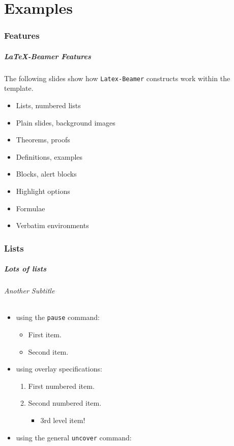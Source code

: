 \part{Examples}
\makepart
\section{Features}
\begin{frame}
        \frametitle{\LaTeX{}-Beamer Features}
        The following slides show how {\tt Latex-Beamer} constructs work within the
        template.
        \begin{itemize}
      \item Lists, numbered lists
      \item Plain slides, background images
      \item Theorems, proofs
      \item Definitions, examples
      \item Blocks, alert blocks
      \item Highlight options
      \item Formulae
      \item Verbatim environments
    \end{itemize}
\end{frame}

\section{Lists}
\begin{frame}
        \frametitle{Lots of lists}
        \framesubtitle{Another Subtitle}
        \begin{itemize}
          \item using the \texttt{pause} command:
          \begin{itemize}
            \item First item.
            \pause
            \item Second item.
          \end{itemize}
          \item using overlay specifications:
          \begin{enumerate}
            \item<3-> First numbered item.
            \item<4-> Second numbered item.
            \begin{itemize}
              \item 3rd level item!
            \end{itemize}
          \end{enumerate}
          \item using the general \texttt{uncover} command:
          \begin{itemize}
          \end{itemize}
        \end{itemize}
\end{frame}

